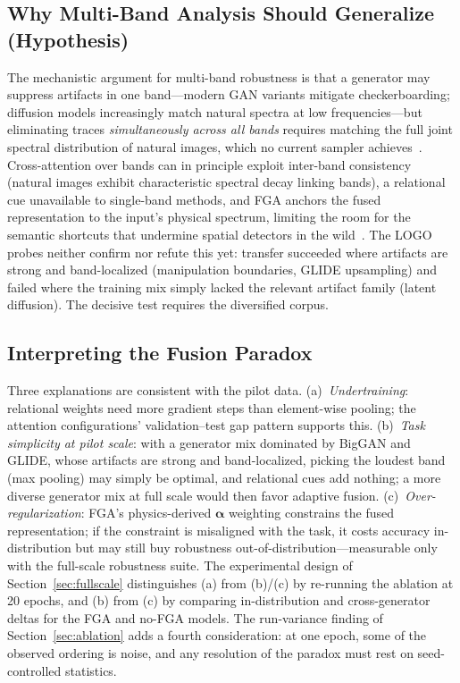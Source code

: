\documentclass[journal]{IEEEtran}
\begin{document}
\subsection{Why Multi-Band Analysis Should Generalize (Hypothesis)}
The mechanistic argument for multi-band robustness is that a generator may suppress artifacts in one band---modern GAN variants mitigate checkerboarding; diffusion models increasingly match natural spectra at low frequencies---but eliminating traces \emph{simultaneously across all bands} requires matching the full joint spectral distribution of natural images, which no current sampler achieves~\cite{corvi2023,ricker2024}. Cross-attention over bands can in principle exploit inter-band consistency (natural images exhibit characteristic spectral decay linking bands), a relational cue unavailable to single-band methods, and FGA anchors the fused representation to the input's physical spectrum, limiting the room for the semantic shortcuts that undermine spatial detectors in the wild~\cite{yan2025sanity,shuai2026shortcuts}. The LOGO probes neither confirm nor refute this yet: transfer succeeded where artifacts are strong and band-localized (manipulation boundaries, GLIDE upsampling) and failed where the training mix simply lacked the relevant artifact family (latent diffusion). The decisive test requires the diversified corpus.

\subsection{Interpreting the Fusion Paradox}
Three explanations are consistent with the pilot data. (a)~\emph{Undertraining}: relational weights need more gradient steps than element-wise pooling; the attention configurations' validation--test gap pattern supports this. (b)~\emph{Task simplicity at pilot scale}: with a generator mix dominated by BigGAN and GLIDE, whose artifacts are strong and band-localized, picking the loudest band (max pooling) may simply be optimal, and relational cues add nothing; a more diverse generator mix at full scale would then favor adaptive fusion. (c)~\emph{Over-regularization}: FGA's physics-derived $\boldsymbol{\alpha}$ weighting constrains the fused representation; if the constraint is misaligned with the task, it costs accuracy in-distribution but may still buy robustness out-of-distribution---measurable only with the full-scale robustness suite. The experimental design of Section~\ref{sec:fullscale} distinguishes (a) from (b)/(c) by re-running the ablation at 20 epochs, and (b) from (c) by comparing in-distribution and cross-generator deltas for the FGA and no-FGA models. The run-variance finding of Section~\ref{sec:ablation} adds a fourth consideration: at one epoch, some of the observed ordering is noise, and any resolution of the paradox must rest on seed-controlled statistics.
\end{document}

